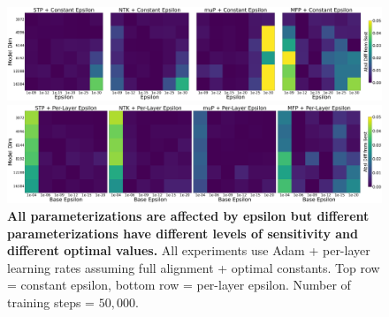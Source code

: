 \documentclass{article}
\theoremstyle{plain}
\theoremstyle{definition}
\theoremstyle{remark}
\begin{document}
\begin{figure}[ht]
    \begin{center}
        \includegraphics[width=\linewidth, trim={0, 0, 0, 0},clip]{icml2024/figures/epsilon/appendix_heatmaps/constant_epsilon_heatmaps.png}
       
        \figvspace
       
        \includegraphics[width=\linewidth, trim={0, 0, 0, 0},clip]{icml2024/figures/epsilon/appendix_heatmaps/per_layer_epsilon_heatmaps.png}
       
       
        \caption{\textbf{All parameterizations are affected by epsilon but different parameterizations have different levels of sensitivity and different optimal values.} All experiments use Adam + per-layer learning rates assuming full alignment + optimal constants. Top row = constant epsilon, bottom row = per-layer epsilon. Number of training steps = $50{,}000$.}
        \label{fig:epsilon_appendix_heatmaps}
        \vspace{-24pt}
    \end{center}
\end{figure}
\end{document}
